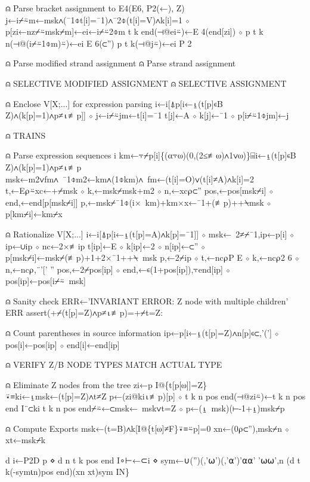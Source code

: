 \documentclass{article}%
\begin{document}
⍝ Parse bracket assignment to E4(E6, P2(←), Z)
         j←i⌿⍨m←msk∧(¯1⌽t[i]=¯1)∧¯2⌽(t[i]=V)∧k[i]=1 ⋄ p[zi←nz⌿⍨msk⌿m]←ei←i⌿⍨2⌽m
         t k end(⊣@ei⍨)←E 4(end[zi]) ⋄ p t k n(⊣@(i⌿⍨1⌽m)⍨)←ei E 6(⊂'')
         p t k(⊣@j⍨)←ei P 2

⍝ Parse modified strand assignment
⍝ Parse strand assignment

⍝ SELECTIVE MODIFIED ASSIGNMENT
⍝ SELECTIVE ASSIGNMENT

⍝ Enclose V[X;...] for expression parsing
         i←i[⍋p[i←⍸(t[p]∊B Z)∧(k[p]=1)∧p≠⍳≢p]] ⋄ j←i⌿⍨jm←t[i]=¯1
         t[j]←A ⋄ k[j]←¯1 ⋄ p[i⌿⍨1⌽jm]←j

⍝ TRAINS

⍝ Parse expression sequences
         i km←⍪⌿p[i]\{(⍺⍪⍵)(0,(2≤≢⍵)∧1∨⍵)\}⌸i←⍸(t[p]∊B Z)∧(k[p]=1)∧p≠⍳≢p
         msk←m2∨fm∧~¯1⌽m2←km∧(1⌽km)∧~fm←(t[i]=O)∨(t[i]≠A)∧k[i]=2
         t,←E⍴⍨xc←+⌿msk ⋄ k,←msk⌿msk+m2 ⋄ n,←xc⍴⊂''
         pos,←pos[msk⌿i] ⋄ end,←end[p[msk⌿i]]
         p,←msk⌿¯1⌽(i×~km)+km×x←¯1+(≢p)++⍀msk ⋄ p[km⌿i]←km⌿x

⍝ Rationalize V[X;...]
         i←i[⍋p[i←⍸(t[p]=A)∧k[p]=¯1]] ⋄ msk←~2≠⌿¯1,ip←p[i] ⋄ ip←∪ip ⋄ nc←2×≢ip
         t[ip]←E ⋄ k[ip]←2 ⋄ n[ip]←⊂'' ⋄ p[msk⌿i]←msk⌿(≢p)+1+2×¯1++⍀~msk
         p,←2⌿ip ⋄ t,←nc⍴P E ⋄ k,←nc⍴2 6 ⋄ n,←nc⍴,¨'[' ''
         pos,←2⌿pos[ip] ⋄ end,←∊(1+pos[ip]),⍪end[ip] ⋄ pos[ip]←pos[i⌿⍨~msk]

⍝ Sanity check
         ERR←'INVARIANT ERROR: Z node with multiple children'
         ERR assert(+⌿(t[p]=Z)∧p≠⍳≢p)=+⌿t=Z:

⍝ Count parentheses in source information
         ip←p[i←⍸(t[p]=Z)∧n[p]∊⊂,'('] ⋄ pos[i]←pos[ip] ⋄ end[i]←end[ip]

⍝ VERIFY Z/B NODE TYPES MATCH ACTUAL TYPE

⍝ Eliminate Z nodes from the tree
         zi←p I@\{t[p[⍵]]=Z\}⍣≡ki←⍸msk←(t[p]=Z)∧t≠Z
         p←(zi@ki⍳≢p)[p] ⋄ t k n pos end(⊣@zi⍨)←t k n pos end I¨⊂ki
         t k n pos end⌿⍨←⊂msk←~msk∨t=Z ⋄ p←(⍸~msk)(⊢-1+⍸)msk⌿p

⍝ Compute Exports
         msk←(t=B)∧k[I@\{t[⍵]≠F\}⍣≡⍨p]=0
         xn←(0⍴⊂''),msk⌿n ⋄ xt←msk⌿k

         d i←P2D p ⋄ d n t k pos end I∘⊢←⊂i ⋄ sym←∪('')(,'⍵')(,'⍺')'⍺⍺' '⍵⍵',n
         (d t k(-sym⍳n)pos end)(xn xt)sym IN\}
\nwendcode{}\nwdocspar
\end{document}
